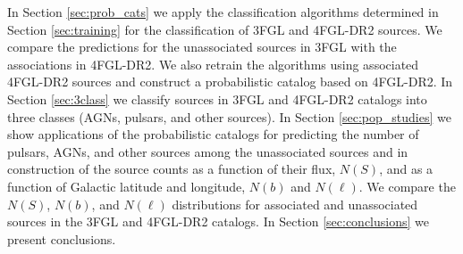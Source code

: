 In Section \ref{sec:prob_cats} we apply the classification algorithms determined in Section \ref{sec:training} for the classification of 3FGL and 4FGL-DR2 sources.
We compare the predictions for the unassociated sources in 3FGL with the associations in 4FGL-DR2.
We also retrain the algorithms using associated 4FGL-DR2 sources and construct a probabilistic catalog based on 4FGL-DR2.
In Section \ref{sec:3class} we classify sources in 3FGL and 4FGL-DR2 catalogs into three classes (AGNs, pulsars, and other sources).
In Section \ref{sec:pop_studies} we show applications of the probabilistic catalogs for predicting the number of pulsars, AGNs, and other sources among the unassociated sources and in construction of the source counts as a function of their flux, $N(S)$, and as a function of 
Galactic latitude and longitude, $N(b)$ and $N(\ell)$.
We compare the $N(S)$, $N(b)$, and $N(\ell)$ distributions for associated and unassociated sources in the 3FGL and 4FGL-DR2 catalogs.
In Section \ref{sec:conclusions} we present conclusions.


